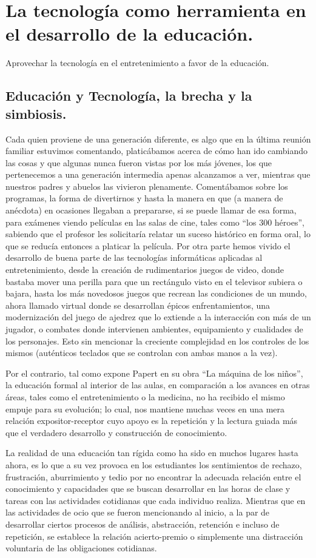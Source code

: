 \chapter{La tecnología como herramienta en el desarrollo de la educación.}
Aprovechar la tecnología en el entretenimiento a favor de la educación.
\section{Educación y Tecnología, la brecha y la simbiosis.}

Cada quien proviene de una generación diferente, es algo que en la última reunión familiar estuvimos comentando, platicábamos acerca de cómo han ido cambiando las cosas y que algunas nunca fueron vistas por los más jóvenes, los que pertenecemos a una generación intermedia apenas alcanzamos a ver, mientras que nuestros padres y abuelos las vivieron plenamente. Comentábamos sobre los programas, la forma de divertirnos y hasta la manera en que (a manera de anécdota) en ocasiones llegaban a prepararse, si se puede llamar de esa forma, para exámenes viendo películas en las salas de cine, tales como “los 300 héroes”, sabiendo que el profesor les solicitaría relatar un suceso histórico en forma oral, lo que se reducía entonces a platicar la película. Por otra parte hemos vivido el desarrollo de buena parte de las tecnologías informáticas aplicadas al entretenimiento, desde la creación de rudimentarios juegos de video, donde bastaba mover una perilla para que un rectángulo visto en el televisor subiera o bajara, hasta los más novedosos juegos que recrean las condiciones de un mundo, ahora llamado virtual donde se desarrollan épicos enfrentamientos, una modernización del juego de ajedrez que lo extiende a la interacción con más de un jugador, o combates donde intervienen ambientes, equipamiento y cualidades de los personajes. Esto sin mencionar la creciente complejidad en los controles de los mismos (auténticos teclados que se controlan con ambas manos a la vez).

Por el contrario, tal como expone Papert en su obra “La máquina de los niños”, la educación formal al interior de las aulas, en comparación a los avances en otras áreas, tales como el entretenimiento o la medicina, no ha recibido el mismo empuje para su evolución; lo cual, nos mantiene muchas veces en una mera relación expositor-receptor cuyo apoyo es la repetición y la lectura guiada más que el verdadero desarrollo y construcción de conocimiento.

La realidad de una educación tan rígida como ha sido en muchos lugares hasta ahora, es lo que a su vez provoca en los estudiantes los sentimientos de rechazo, frustración, aburrimiento y tedio por no encontrar la adecuada relación entre el conocimiento y capacidades que se buscan desarrollar en las horas de clase y tareas con las actividades cotidianas que cada individuo realiza. Mientras que en las actividades de ocio que se fueron mencionando al inicio, a la par de desarrollar ciertos procesos de análisis, abstracción, retención e incluso de repetición, se establece la relación acierto-premio o simplemente una distracción voluntaria de las obligaciones cotidianas.

